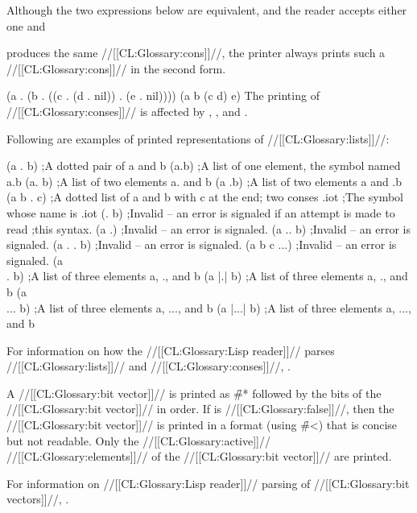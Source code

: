Although the two expressions below are equivalent,
and the reader accepts
either one and 


produces
the same //[[CL:Glossary:cons]]//, the printer
always prints such a //[[CL:Glossary:cons]]// in the second form.

\code
 (a . (b . ((c . (d . nil)) . (e . nil))))
 (a b (c d) e)
\endcode
The printing of //[[CL:Glossary:conses]]// is affected by ,
, and .


\goodbreak         
Following are examples of printed representations of //[[CL:Glossary:lists]]//:

\code
 (a . b)     ;A dotted pair of a and b
 (a.b)       ;A list of one element, the symbol named a.b
 (a. b)      ;A list of two elements a. and b
 (a .b)      ;A list of two elements a and .b
 (a b . c)   ;A dotted list of a and b with c at the end; two conses
 .iot        ;The symbol whose name is .iot
 (. b)       ;Invalid -- an error is signaled if an attempt is made to read 
             ;this syntax.
 (a .)       ;Invalid -- an error is signaled.
 (a .. b)    ;Invalid -- an error is signaled.
 (a . . b)   ;Invalid -- an error is signaled.
 (a b c ...) ;Invalid -- an error is signaled.
 (a \\. b)    ;A list of three elements a, ., and b
 (a |.| b)   ;A list of three elements a, ., and b
 (a \\... b)  ;A list of three elements a, ..., and b
 (a |...| b) ;A list of three elements a, ..., and b
\endcode

For information on how the //[[CL:Glossary:Lisp reader]]// parses //[[CL:Glossary:lists]]// and //[[CL:Glossary:conses]]//,
\seesection\LeftParen. 
     
\endsubsubsection%


A //[[CL:Glossary:bit vector]]// is printed as \f{\#*} followed by the bits of the //[[CL:Glossary:bit vector]]//
in order.  If  is //[[CL:Glossary:false]]//, then the //[[CL:Glossary:bit vector]]// is
printed in a format (using \f{\#<}) that is concise but not readable.
Only the //[[CL:Glossary:active]]// //[[CL:Glossary:elements]]// of the //[[CL:Glossary:bit vector]]// are printed.



For information on //[[CL:Glossary:Lisp reader]]// parsing of //[[CL:Glossary:bit vectors]]//,
\seesection\SharpsignStar.

